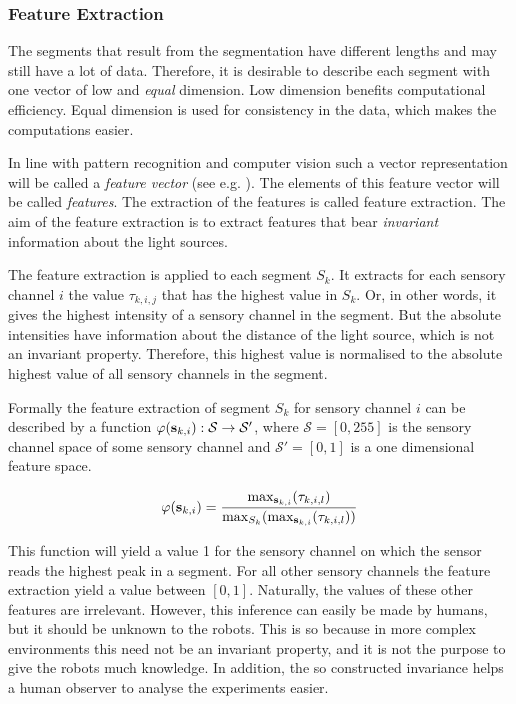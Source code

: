 \subsubsection{Feature Extraction}


The segments that result from the segmentation have different lengths and may still have a lot of data. Therefore, it is desirable to describe each segment with one vector of low and {\em equal} dimension. Low dimension benefits computational efficiency. Equal dimension is used for consistency in the data, which makes the computations easier.

In line with pattern recognition and computer vision such a vector representation will be called a {\em feature vector} (see e.g. \citep{fu:1976}). The elements of this feature vector will be called {\em features}. The extraction of the features is called feature extraction. The aim of the feature extraction is to extract features that bear {\em invariant} information about the light sources.


The feature extraction is applied to each segment $S_k$. It extracts for each sensory channel $i$ the value $\tau_{k,i,j}$ that has the highest value in $S_k$. Or, in other words, it gives the highest intensity of a sensory channel in the segment. But the absolute intensities have information about the distance of the light source, which is not an invariant property. Therefore, this highest value is normalised to the absolute highest value of all sensory channels in the segment. 

Formally the feature extraction of segment $S_k$ for sensory channel $i$ can be described by a function $\varphi({\bf s}_{k,i}):{\mathcal{S}} \rightarrow {\mathcal{S}'}$, where ${\mathcal{S}}=[0,255]$ is the sensory channel space of some sensory channel and ${\mathcal S}'=[0,1]$ is a one dimensional feature space.

\begin{eqnarray}
\varphi({\bf s}_{k,i}) = \frac{\max_{{\bf s}_{k,i}} (\tau_{k,i,l})}{\max_{S_k} (\max_{{\bf s}_{k,i}} (\tau_{k,i,l}))}
\label{e:sc-norm}
\end{eqnarray}


This function will yield a value 1 for the sensory channel on which the sensor reads the highest peak in a segment. For all other sensory channels the feature extraction yield a value between $[0,1]$. Naturally, the values of these other features are irrelevant. However, this inference can easily be made by humans, but it should be unknown to the robots. This is so because in more complex environments this need not be an invariant property, and it is not the purpose to give the robots much knowledge. In addition, the so constructed invariance helps a human observer to analyse the experiments easier. 

